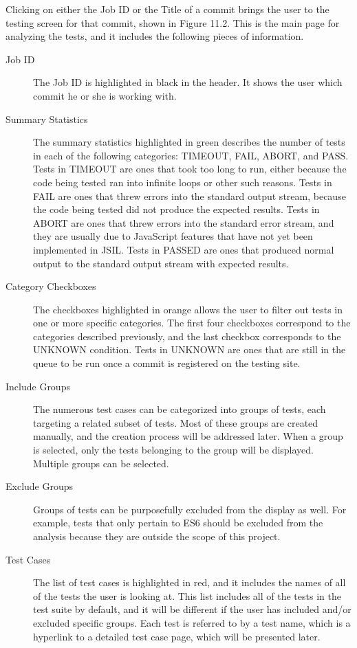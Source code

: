 \documentclass[a4paper,11pt,twoside]{report}
\begin{document}
Clicking on either the Job ID or the Title of a commit brings the user to the testing screen for that commit, shown in Figure 11.2. This is the main page for analyzing the tests, and it includes the following pieces of information.

\begin{description}
\item[Job ID] The Job ID is highlighted in black in the header. It shows the user which commit he or she is working with.

\item[Summary Statistics] The summary statistics highlighted in green describes the number of tests in each of the following categories: TIMEOUT, FAIL, ABORT, and PASS. Tests in TIMEOUT are ones that took too long to run, either because the code being tested ran into infinite loops or other such reasons. Tests in FAIL are ones that threw errors into the standard output stream, because the code being tested did not produce the expected results. Tests in ABORT are ones that threw errors into the standard error stream, and they are usually due to JavaScript features that have not yet been implemented in JSIL. Tests in PASSED are ones that produced normal output to the standard output stream with expected results.

\item[Category Checkboxes] The checkboxes highlighted in orange allows the user to filter out tests in one or more specific categories. The first four checkboxes correspond to the categories described previously, and the last checkbox corresponds to the UNKNOWN condition. Tests in UNKNOWN are ones that are still in the queue to be run once a commit is registered on the testing site.

\item[Include Groups] The numerous test cases can be categorized into groups of tests, each targeting a related subset of tests. Most of these groups are created manually, and the creation process will be addressed later. When a group is selected, only the tests belonging to the group will be displayed. Multiple groups can be selected.

\item[Exclude Groups] Groups of tests can be purposefully excluded from the display as well. For example, tests that only pertain to ES6 should be excluded from the analysis because they are outside the scope of this project.

\item[Test Cases] The list of test cases is highlighted in red, and it includes the names of all of the tests the user is looking at. This list includes all of the tests in the test suite by default, and it will be different if the user has included and/or excluded specific groups. Each test is referred to by a test name, which is a hyperlink to a detailed test case page, which will be presented later.


\end{description}
\end{document}
